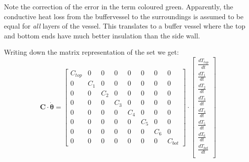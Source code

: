 \begin{scriptsize}
	Note the correction of the error in the term coloured green. Apparently, the conductive heat loss from the buffervessel to the surroundings is assumed to be equal for \emph{all} layers of the vessel. This translates to a buffer vessel where the top and bottom ends have much better insulation than the side wall.
	
	Writing down the matrix representation of the set we get:
	\begin{equation}
		\mathbf{C} \cdot \boldsymbol{\dot{\theta}} =
		\begin{bmatrix}
			C_{top} & 0 & 0 & 0 & 0 & 0 & 0 & 0 \\
			0 &  C_{1} & 0 & 0 & 0 & 0 & 0 & 0 \\
			0 &  0 & C_{2} & 0 & 0 & 0 & 0 & 0 \\
			0 &  0 & 0 & C_{3} & 0 & 0 & 0 & 0 \\
			0 &  0 & 0 & 0 & C_{4} & 0 & 0 & 0 \\
			0 &  0 & 0 & 0 & 0 & C_{5} & 0 & 0 \\
			0 &  0 & 0 & 0 & 0 & 0 & C_{6} & 0 \\
			0 & 0 & 0 & 0 & 0 & 0 & 0 & C_{bot}
		\end{bmatrix}
		\cdot
		\begin{bmatrix}
			\frac{dT_{top}}{dt} \\
			\frac{dT_{1}}{dt} \\
			\frac{dT_{2}}{dt} \\
			\frac{dT_{3}}{dt} \\
			\frac{dT_{4}}{dt} \\
			\frac{dT_{5}}{dt} \\
			\frac{dT_{6}}{dt} \\
			\frac{dT_{bot}}{dt} \\
		\end{bmatrix}
	\end{equation}
	

\end{scriptsize}
